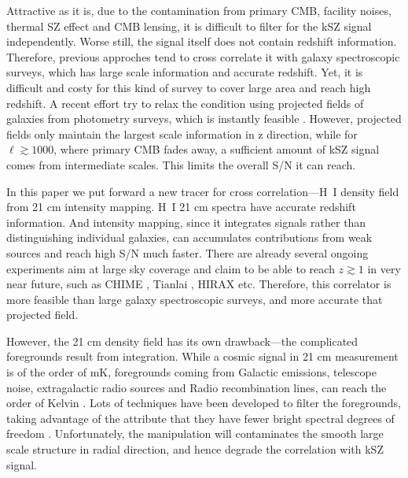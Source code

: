 Attractive as it is, 
due to the contamination from primary CMB, facility noises, 
thermal SZ effect and CMB lensing, 
it is difficult to filter for the kSZ signal independently. 
Worse still, the signal itself does not contain redshift information.
Therefore, previous approches tend to cross correlate it with 
galaxy spectroscopic surveys, 
which has large scale information and accurate redshift. 
Yet, it is difficult and costy for this kind of survey to cover large area 
and reach high redshift.  
A recent effort try to relax the condition using projected fields of galaxies 
from photometry surveys, which is instantly feasible \cite{Hill16}. 
However, projected fields only maintain the largest scale information in z direction, 
while for $\ell\gtrsim1000$, where primary CMB fades away, a sufficient amount of kSZ signal comes from intermediate scales. 
This limits the overall S/N it can reach.

In this paper we put forward a new tracer for cross correlation---H~I density field from 21 cm intensity mapping. 
H~I 21 cm spectra have accurate redshift information. 
And intensity mapping, since it 
integrates signals 
rather than distinguishing individual galaxies, 
can accumulates contributions from weak sources 
and reach high S/N much faster. 
There are already several ongoing experiments aim at large sky coverage and claim to be able to reach $z\gtrsim1$ in very near future, such as
CHIME \cite{2014SPIE.9145E..22B}, Tianlai \cite{2015ApJ...798...40X}, 
HIRAX \cite{HIRAX} etc.
Therefore, this correlator is more feasible than large galaxy spectroscopic surveys, 
and more accurate that projected field.

However, the 21 cm density field has its own drawback---the complicated foregrounds result from integration. 
While a cosmic signal in 21 cm measurement is of the order of mK,  
foregrounds coming from Galactic emissions, telescope noise, 
extragalactic radio sources and Radio recombination lines, 
can reach the order of Kelvin \cite{DiMatteo04,Masui13}. 
Lots of techniques have been developed to filter the foregrounds, 
taking advantage of the attribute that they have fewer bright spectral
degrees of freedom \cite{Switzer15}.
Unfortunately, the manipulation will contaminates the smooth large scale structure in radial direction, 
and hence degrade the correlation with kSZ signal.


